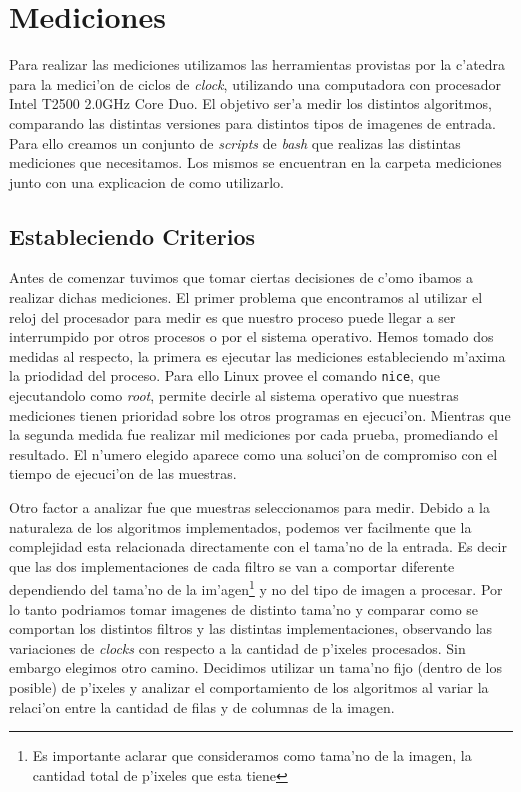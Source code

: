 \section{Mediciones}
\label{sec:mediciones}
Para realizar las mediciones utilizamos las herramientas provistas por la c'atedra para la medici'on de ciclos de \textit{clock}, utilizando una computadora con procesador Intel T2500 2.0GHz Core Duo. El objetivo ser'a medir los distintos algoritmos, comparando las distintas versiones para distintos tipos de imagenes de entrada. Para ello creamos un conjunto de \textit{scripts} de \textit{bash} que realizas las distintas mediciones que necesitamos. Los mismos se encuentran en la carpeta mediciones junto con una explicacion de como utilizarlo.

\subsection{Estableciendo Criterios}

Antes de comenzar tuvimos que tomar ciertas decisiones de c'omo ibamos a realizar dichas mediciones. El primer problema que encontramos al utilizar el reloj del procesador para medir es que nuestro proceso puede llegar a ser interrumpido por otros procesos o por el sistema operativo. Hemos tomado dos medidas al respecto, la primera es ejecutar las mediciones estableciendo m'axima la priodidad del proceso. Para ello Linux provee el comando \texttt{nice}, que ejecutandolo como \textit{root}, permite decirle al sistema operativo que nuestras mediciones tienen prioridad sobre los otros programas en ejecuci'on. 
Mientras que la segunda medida fue realizar mil mediciones por cada prueba, promediando el resultado. El n'umero elegido aparece como una soluci'on de compromiso con el tiempo de ejecuci'on de las muestras.

Otro factor a analizar fue que muestras seleccionamos para medir. Debido a la naturaleza de los algoritmos implementados, podemos ver facilmente que la complejidad esta relacionada directamente con el tama'no de la entrada. Es decir que las dos implementaciones de cada filtro se van a comportar diferente dependiendo del tama'no de la im'agen\footnote{Es importante aclarar que consideramos como tama'no de la imagen, la cantidad total de p'ixeles que esta tiene} y no del tipo de imagen a procesar. Por lo tanto podriamos tomar imagenes de distinto tama'no y comparar como se comportan los distintos filtros y las distintas implementaciones, observando las variaciones de \textit{clocks} con respecto a la cantidad de p'ixeles procesados. Sin embargo elegimos otro camino. Decidimos utilizar un tama'no fijo (dentro de los posible) de p'ixeles y analizar el comportamiento de los algoritmos al variar la relaci'on entre la cantidad de filas y de columnas de la imagen. 

